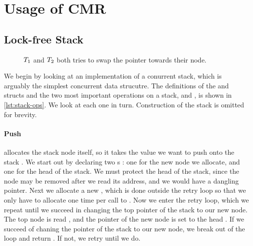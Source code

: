 \chapter{Usage of CMR}
\blindtext{}

\section{Lock-free Stack\label{sec:usage-stack}}

\begin{figure}[b]
\centering

\caption{$T\sb{1}$ and $T\sb{2}$ both tries to swap the  pointer towards their
node.}
\end{figure}

We begin by looking at an implementation of a conurrent stack, which is arguably the simplest
concurrent data strucutre. The definitions of the  and  structs and the two
most important operations on a stack,  and , is shown in \cref{lst:stack-ops}.
We look at each one in turn. Construction of the stack is omitted for brevity.

\begin{figure}[ht]

\end{figure}

\subsubsection{Push}

 allocates the stack node itself, so it takes the value we want to push onto the stack
. We start out by declaring two s : one for the new node we
allocate, and one for the head of the stack. We must protect the head of the stack, since the node
may be removed after we read its address, and we would have a dangling pointer.  Next we allocate a
new  , which is done outside the retry loop so that we only have to
allocate one time per call to . Now we enter the retry loop, which we repeat until we
succeed in changing the top pointer of the stack to our new node.
The top node is read , and the  pointer of the new node is set to the head
. If we succeed of chaning the   pointer of the stack to our new node, we
break out of the loop and return . If not, we retry until we do.


